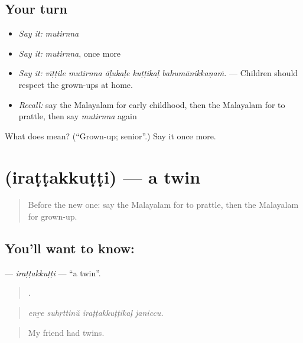 \subsection*{Your turn}
\begin{itemize}
\raggedright
  \item \emph{Say it:} \emph{mutirnna}
  \item \emph{Say it:} \emph{mutirnna}, once more
  \item \emph{Say it:} \emph{vīṭṭile mutirnna āḷukaḷe kuṭṭikaḷ bahumānikkaṇaṁ.} — Children should respect the grown-ups at home.
  \item \emph{Recall:} say the Malayalam for early childhood, then the Malayalam for to prattle, then say \emph{mutirnna} again
\end{itemize}

\begin{tcolorbox}[breakable,colback=teal!4,colframe=teal!35!black,title={Before you move on}]
What does  mean? (\textquotedblleft{}Grown-up; senior\textquotedblright{}.) Say it once more.
\end{tcolorbox}
\section[\texorpdfstring{\ml{ഇരട്ടക്കുട്ടി} (iraṭṭakkuṭṭi)}{ഇരട്ടക്കുട്ടി (iraṭṭakkuṭṭi)}]{ (iraṭṭakkuṭṭi) — a twin}

\label{lesson:ML-C558-irattakkutti}



\begin{quote}
Before the new one: say the Malayalam for to prattle, then the Malayalam for grown-up.
\end{quote}

\subsection*{You'll want to know: }
\textbf{} — \emph{iraṭṭakkuṭṭi} — \textquotedblleft{}a twin\textquotedblright{}.

\begin{quote}
   .
\end{quote}

\begin{quote}
\emph{enṟe suhṛttinŭ iraṭṭakkuṭṭikaḷ janiccu.}
\end{quote}

\begin{quote}
My friend had twins.
\end{quote}

